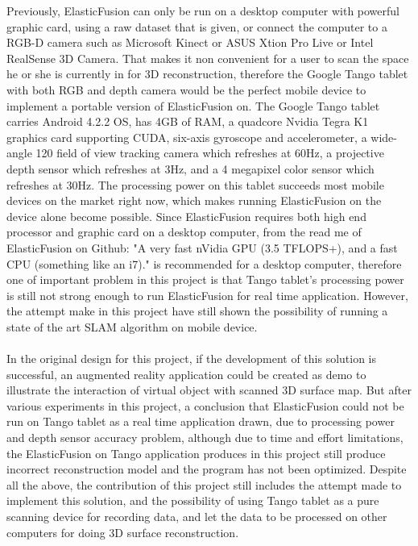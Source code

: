 \documentclass[12pt,twoside]{article}
\begin{document}
Previously, ElasticFusion can only be run on a desktop computer with powerful graphic card, using a raw dataset that is given, or connect the computer to a RGB-D camera such as Microsoft Kinect or ASUS Xtion Pro Live or Intel RealSense 3D Camera. That makes it non convenient for a user to scan the space he or she is currently in for 3D reconstruction, therefore the Google Tango tablet with both RGB and depth camera would be the perfect mobile device to implement a portable version of ElasticFusion on. The Google Tango tablet carries Android 4.2.2 OS, has 4GB of RAM, a quadcore Nvidia Tegra K1 graphics card supporting CUDA, six-axis gyroscope and accelerometer, a wide-angle 120 field of view tracking camera which refreshes at 60Hz, a projective depth sensor which refreshes at 3Hz, and a 4 megapixel color sensor which refreshes at 30Hz. The processing power on this tablet succeeds most mobile devices on the market right now, which makes running ElasticFusion on the device alone become possible. Since ElasticFusion requires both high end processor and graphic card on a desktop computer, from the read me of ElasticFusion on Github: "A very fast nVidia GPU (3.5 TFLOPS+), and a fast CPU (something like an i7)." is recommended for a desktop computer, therefore one of important problem in this project is that Tango tablet's processing power is still not strong enough to run ElasticFusion for real time application. However, the attempt make in this project have still shown the possibility of running a state of the art SLAM  algorithm on mobile device.\\
\\
In the original design for this project, if the development of this solution is successful, an augmented reality application could be created as demo to illustrate the interaction of virtual object with scanned 3D surface map. But after various experiments in this project, a conclusion that ElasticFusion could not be run on Tango tablet as a real time application drawn, due to processing power and depth sensor accuracy problem, although due to time and effort limitations, the ElasticFusion on Tango application produces in this project still produce incorrect reconstruction model and the program has not been optimized. Despite all the above, the contribution of this project still includes the attempt made to implement this solution, and the possibility of using Tango tablet as a pure scanning device for recording data, and let the data to be processed on other computers for doing 3D surface reconstruction.\\
\end{document}
